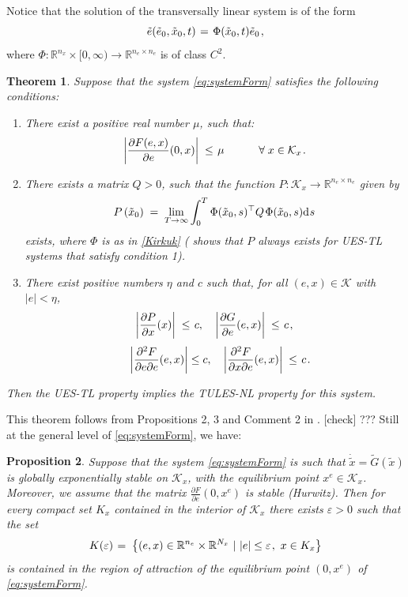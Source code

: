 \documentclass[letterpaper,10pt,conference]{ieeeconf}
\newtheorem{theorem}{Theorem}[section]
\newtheorem{proposition}[theorem]{Proposition}
\newcommand{\BE}{\begin{equation}}
\newcommand{\BEQ}[1]{\BE\label{#1}} %
\newcommand{\rline}  {{\mathbb R}}
\newcommand{\e}      {{\varepsilon}}
\newcommand{\m}      {{\hbox{\hskip 1pt}}}
\newcommand{\dd}     {{\rm d\hbox{\hskip 0.5pt}}}
\newcommand{\Kmscr}  {{\mathcal{K}}}
\newcommand{\FORALL} {{\hbox{$\hskip 11mm \forall \;$}}}
\newcommand{\rarrow} {{\rightarrow}}
\begin{document}
Notice that the solution of the transversally linear system is of the 
form \vspace{-3mm}
\BEQ{Kirkuk}
   \tilde e(\tilde e_0,\tilde x_0,t) \m=\m \Phi(\tilde x_0,t) 
   \tilde e_0 \m,
\end{equation}
where $\Phi:\rline^{n_x}\times[0,\infty)\rarrow\rline^{n_e\times 
n_e}$ is of class $C^2$.

\begin{theorem} \label{thm:TULESNL2UESTL}
Suppose that the system \eqref{eq:systemForm} satisfies the following
conditions:
\begin{enumerate}
\item \label{condition1}
There exist a positive real number $\mu$, such that: 
$$ \left|\frac{\partial F(e,x)}{\partial e}(0,x)\right| \m\leq\m \mu
   \FORALL x\in\Kmscr_x \m.$$

\item \label{ugly_integral}
There exists a matrix $Q>0$, such that the function 
$P:\Kmscr_x\to\rline^{n_e\times n_e}$ given by
\BEQ{simhat_tora}
   P\left(\tilde{x}_0\right) \m=\m \lim_{T\to\infty} \int_0^T 
   \Phi(\tilde{x}_0,s)^\top Q \m\Phi(\tilde{x}_0,s) \dd s
\end{equation}
exists, where $\Phi$ is as in \eqref{Kirkuk} 
(\cite{AndrieuJayawardhanaPraly} shows that $P$ always exists for 
UES-TL systems that satisfy condition 1).

\item \label{many_bounds}
There exist positive numbers $\eta$ and $c$ such that, for all 
$(e,x)\in\Kmscr$ with $|e|<\eta$,
$$ \left| \frac{\partial P}{\partial x}(x)\right| \m\leq\m c,
   \quad\left| \frac{\partial G}{\partial e}(e,x)\right| 
   \m\leq\m c \m,$$
$$ \quad  \left| \frac{\partial^2 F}{\partial e \partial e}(e,x)
   \right| \le c, \quad  \left| \frac{\partial^2 F}{\partial x 
   \partial e}(e,x)\right| \m\leq\m c\m.$$
\end{enumerate}

Then the UES-TL property implies the TULES-NL property for this 
system.
\end{theorem}

\medskip
This theorem follows from Propositions 2, 3 and Comment 2 in
\cite{AndrieuJayawardhanaPraly}. [check] ??? Still at the general
level of \eqref{eq:systemForm}, we have:

\begin{proposition} \label{Nahal_Zin}
Suppose that the system \eqref{eq:systemForm} is such that $\dot{
\tilde x}=\tilde{G}(\tilde{x})$ is globally exponentially stable
on $\Kmscr_x$, with the equilibrium point $x^e\in\Kmscr_x$. Moreover,
we assume that the matrix $\frac{\partial F}{\partial e}(0,x^e)$ 
is stable (Hurwitz). Then for every compact set $K_x$ contained in the
interior of $\Kmscr_x$ there exists $\e>0$ such that the set
$$ K(\e) \m=\m \left\{ (e,x)\in\rline^{n_e}\times\rline^{N_x}\ |\
   |e|\leq\e\m,\ x\in K_x \right\}$$
is contained in the region of attraction of the equilibrium point
$(0,x^e)$ of \eqref{eq:systemForm}.
\end{proposition}
\end{document}
